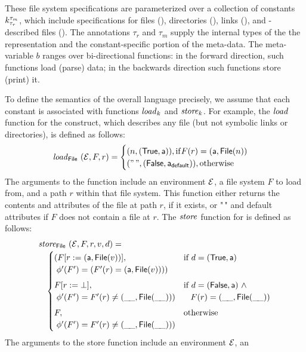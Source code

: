 These file system specifications are parameterized over a collection
of constants $k^{\tau_m}_{\tau_r}$, which include
specifications for files (\pfile), directories (\pdir),
links (\plink), and \padshaskell{}-described files (). The
annotations $\tau_r$ and $\tau_m$ supply the internal types
of the the representation and the constant-specific portion of the meta-data. The
meta-variable $b$ ranges over bi-directional functions:  in the forward
direction, such functions load (parse) data; in the backwards direction 
such functions store (print) it.

To define the semantics of the overall language precisely,
we assume that each constant is associated with functions
$\mathit{load}_{k}$ and $\mathit{store}_{k}$. For example, the $\mathit{load}_{}$
function for the \pfile{} construct, which describes any file (but not
symbolic links or directories), is defined as follows:
%
\[
\mathit{load}_{\mathsf{File}}~(\mathcal{E},F,r) =
\begin{cases}
  (n,(\mathsf{True},\mathsf{a})), \mathrm{if } F(r) = (\mathsf{a},\mathsf{File}(n)) \\
  ("{\,}",(\mathsf{False},\mathsf{a}_{\mathsf{default}})), \mathrm{otherwise}\\
\end{cases}
\]
%
The arguments to the function include an environment $\mathcal{E}$, a file system $F$
to load from, and a path $r$ within that file system.
This function either returns the contents and attributes of the file at path $r$,
if it exists, or "$\,$" and default attributes if $F$ does not contain a
file at $r$.  The $\mathit{store}_{}$ function for \pfile{} is
defined as follows:
%
\[
\begin{array}{l}
\mathit{store}_{\mathsf{File}}~(\mathcal{E},F,r,v,d) =\\[.5ex]
\quad 
\begin{cases}
  (F[r := (\mathsf{a},\mathsf{File}(v))],            & \text{if}~d = (\mathsf{True},\mathsf{a})\\
   \; \phi'(F') = (F'(r) = (\mathsf{a},\mathsf{File}(v))))\\[1ex]
  F[r := \bot],                              & \text{if}~d = (\mathsf{False},\mathsf{a})~\wedge\\
   \; \phi'(F') = F'(r) \neq (\_\!\_,\mathsf{File}(\_\!\_))) & \;\;\; F(r) = (\_\!\_,\mathsf{File}(\_\!\_))\\[1ex]
  F,              & \text{otherwise}\\
   \; \phi'(F') = F'(r) \neq (\_\!\_,\mathsf{File}(\_\!\_)))\\
\end{cases}
\end{array}
\]
The arguments to the store function include an environment $\mathcal{E}$, an
